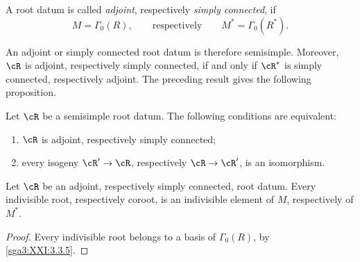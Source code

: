 \begin{definition}\label{sga3:XXI:6.2.6}
A root datum is called \emph{adjoint}, respectively
\emph{simply connected}, if
\[
 M=\Gamma_0(R),
 \qquad\text{respectively}\qquad
 M^\ast=\Gamma_0(R^\ast).
\]
\end{definition}

An adjoint or simply connected root datum is therefore semisimple.
Moreover, \(\cR\) is adjoint, respectively simply connected, if and
only if \(\cR^\ast\) is simply connected, respectively adjoint. The
preceding result gives the following proposition.

\begin{proposition}\label{sga3:XXI:6.2.7}
Let \(\cR\) be a semisimple root datum. The following conditions are
equivalent:
\begin{enumerate}
\item[(i)] \(\cR\) is adjoint, respectively simply connected;
\item[(ii)] every isogeny \(\cR'\to\cR\), respectively
  \(\cR\to\cR'\), is an isomorphism.
\end{enumerate}
\end{proposition}

\begin{proposition}\label{sga3:XXI:6.2.8}
Let \(\cR\) be an adjoint, respectively simply connected, root datum.
Every indivisible root, respectively coroot, is an indivisible element
of \(M\), respectively of \(M^\ast\).
\end{proposition}

\begin{proof}
Every indivisible root belongs to a basis of \(\Gamma_0(R)\), by
\ref{sga3:XXI:3.3.5}.
\end{proof}
